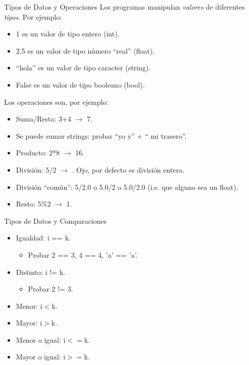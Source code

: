 \documentclass{beamer}
\begin{document}
\begin{frame}{Tipos de Datos y Operaciones}
Los programas manipulan \emph{valores} de diferentes \emph{tipos}. Por ejemplo:
\begin{itemize}
	\item 1 es un valor de tipo entero (int).\pause
	\item 2.5 es un valor de tipo número ``real'' (float).\pause
	\item ``hola'' es un valor de tipo caracter (string).\pause
	\item False es un valor de tipo booleano (bool).\pause
\end{itemize}

Los operaciones son, por ejemplo:
\begin{itemize}
	\item Suma/Resta: 3+4 $\to$ 7.\pause
	\item Se puede sumar strings: probar ``yo y'' + `` mi trasero''.\pause
	\item Producto: 2*8 $\to$ 16.\pause
	\item División: 5/2 $\to$ . \alert{Ojo, por defecto es división entera}.\pause
	\item División ``común'': 5/2.0 o 5.0/2 o 5.0/2.0 (i.e. que alguno sea un float).\pause
	\item Resto: 5\%2 $\to$ 1.
\end{itemize}
\end{frame}


\begin{frame}{Tipos de Datos y Comparaciones}
\begin{itemize}
	\item Igualdad: i == k.\pause
	\begin{itemize}
		\item Probar 2 == 3, 4 == 4, 'a' == 'a'.
	\end{itemize}\pause
	\item Distinto: i != k.\pause
	\begin{itemize}
		\item  Probar 2 != 3.
	\end{itemize}\pause
	\item Menor: i$<$k.\pause
	\item Mayor: i$>$k.\pause
	\item Menor o igual: i$<=$k.\pause
	\item Mayor o igual: i$>=$k.
\end{itemize}
\end{frame}
\end{document}
